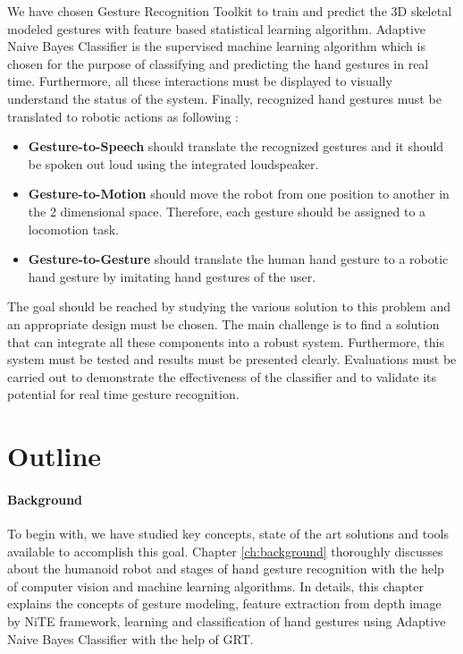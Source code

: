 We have chosen Gesture Recognition Toolkit  \cite{16} to train and predict the 3D skeletal modeled gestures with feature based statistical learning algorithm. Adaptive Naive Bayes Classifier is the supervised machine learning algorithm which is chosen for the purpose of classifying and predicting the hand gestures in real time. Furthermore, all these interactions must be displayed to visually understand the status of the system. Finally, recognized hand gestures must be translated to robotic actions as following :
\begin{itemize}
	\item \textbf{Gesture-to-Speech} should translate the recognized gestures and it should be spoken out loud using the integrated loudspeaker.
	
	\item \textbf{Gesture-to-Motion} should move the robot from one position to another in the 2 dimensional space. Therefore, each gesture should be assigned to a locomotion task.
	
	\item \textbf{Gesture-to-Gesture} should translate the human hand gesture to a robotic hand gesture by imitating hand gestures of the user. 
\end{itemize}

The goal should be reached by studying the various solution to this problem and an appropriate design must be chosen. The main challenge is to find a solution that can integrate all these components into a robust system. Furthermore, this system must be tested and results must be presented clearly. Evaluations must be carried out to demonstrate the effectiveness of the classifier and to validate its potential for real time gesture recognition.

\section{Outline}

\paragraph*{Background} To begin with, we have studied key concepts, state of the art solutions and tools available to accomplish this goal. Chapter \ref{ch:background} thoroughly discusses about the humanoid robot and stages of hand gesture recognition with the help of computer vision and machine learning algorithms. In details, this chapter explains the concepts of gesture modeling, feature extraction from depth image by NiTE framework, learning and classification of hand gestures using Adaptive Naive Bayes Classifier with the help of GRT.

